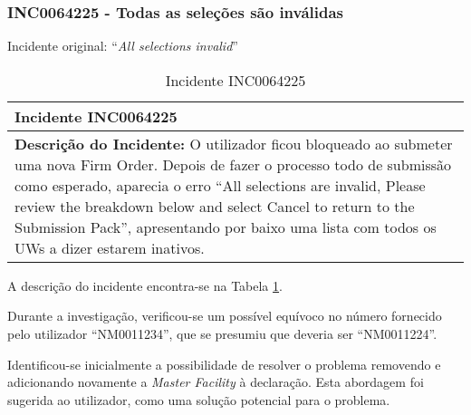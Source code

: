 
        \subsubsection{INC0064225 - Todas as seleções são inválidas}\label{secsec:inc0064225} %

            Incidente original: ``\textit{All selections invalid}''


            \begin{table}[H] %
                \centering
                \caption{Incidente INC0064225}\label{table:usincINC0064225}
                \begin{tabularx}{1\textwidth}{|>{\raggedright\arraybackslash}X|}
                    \hline
                    \rowcolor{lightgray}
                    \textbf{Incidente INC0064225} \\
                    \hline
                    \rowcolor{lightgray!20}
                
                    \textbf{Descrição do Incidente:} O utilizador ficou bloqueado ao submeter uma nova Firm Order. Depois de fazer o processo todo de submissão como esperado, aparecia o erro ``All selections are invalid, Please review the breakdown below and select Cancel to return to the Submission Pack'', apresentando por baixo uma lista com todos os UWs a dizer estarem inativos.

                    \\
                    \hline
                \end{tabularx}
            \end{table}

            A descrição do incidente encontra-se na Tabela \ref{table:usincINC0064225}.

            Durante a investigação, verificou-se um possível equívoco no número fornecido pelo utilizador ``NM0011234'', que se presumiu que deveria ser ``NM0011224''. 

            Identificou-se inicialmente a possibilidade de resolver o problema removendo e adicionando novamente a \textit{Master Facility} à declaração. Esta abordagem foi sugerida ao utilizador, como uma solução potencial para o problema.
            
